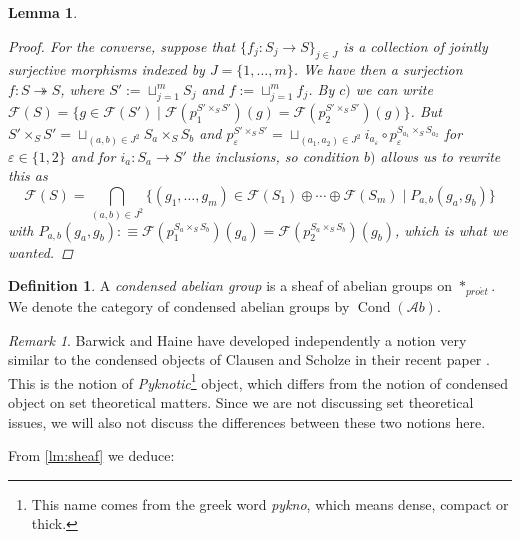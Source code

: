 \documentclass[11pt,A4]{article}
\theoremstyle{plain}
\newtheorem{lm}[thm]{Lemma}
\theoremstyle{definition}
\newtheorem{defn}[thm]{Definition}
\theoremstyle{remark}
\newtheorem{rem}[thm]{Remark}
\newcommand{\1}{\mathbbm{1}}
\newcommand{\F}{\mathcal{F}}
\newcommand{\Ab}{\mathscr{A}b}
\DeclareMathOperator{\Cond}{Cond}
\newcommand{\pe}{*_{pro\acute et}}
\newcommand{\op}{\oplus}
\newcommand{\fp}[1]{\times_{#1}}
\begin{document}
\begin{lm}
\begin{proof}
	For the converse, suppose that $\{f_{j}\colon S_{j}\to S\}_{j\in J}$ is a collection of jointly surjective morphisms indexed by $J=\{ 1,\ldots,m\}$.
	We have then a surjection $f\colon S \twoheadrightarrow S$, where $S':=\sqcup_{j=1}^{m}S_{j}$ and $f:=\sqcup_{j=1}^{m}f_{j}$.
	By $c)$ we can write $\F(S)=\{ g\in \F(S')\mid \F(p_{1}^{S'\fp{S}S'})(g)=\F(p_{2}^{S'\fp{S}S'})(g)\}$.
	But $S'\fp{S}S'=\sqcup_{(a,b)\in J^{2}} S_{a}\fp{S}S_{b}$ and $p_{\varepsilon }^{S'\fp{S}S'}=\sqcup_{(a_{1},a_{2})\in J^{2}} i_{a_{\varepsilon}}\circ p_{\varepsilon }^{S_{a_{1}}\fp{S}S_{a_{2}}}$ for $\varepsilon \in \{1,2\}$ and for $i_{a}\colon S_{a}\to S'$ the inclusions, so condition $b)$ allows us to rewrite this as
	\[ \F(S)=\bigcap_{(a,b)\in J^{2}} \{ (g_{1},\ldots,g_{m})\in \F(S_{1})\op \cdots \op \F(S_{m})\mid P_{a,b}(g_{a},g_{b})\}\]
	with $P_{a,b}(g_{a},g_{b}):\equiv \F(p_{1}^{S_{a}\fp{S}S_{b}})(g_{a})=\F(p_{2}^{S_{a}\fp{S}S_{b}})(g_{b})$, which is what we wanted.	
    \end{proof}
\end{lm}

\begin{defn}
    A \textit{condensed abelian group} is a sheaf of abelian groups on $\pe$.
    We denote the category of condensed abelian groups by $\Cond(\Ab)$.
\end{defn}

\begin{rem}
    Barwick and Haine have developed independently a notion very similar to the condensed objects of Clausen and Scholze in their recent paper \cite{bh19}.
    This is the notion of \textit{Pyknotic}\footnote{This name comes from the greek word \textit{pykno}, which means dense, compact or thick.} object, which differs from the notion of condensed object on set theoretical matters.
    Since we are not discussing set theoretical issues, we will also not discuss the differences between these two notions here.
\end{rem}

From \cref{lm:sheaf} we deduce:
\end{document}
